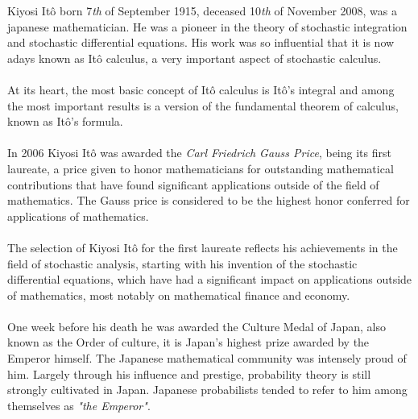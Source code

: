 \documentclass[11pt,a4paper, final]{article}
\begin{document}
\noindent Kiyosi Itô born 7\textit{th} of September 1915, deceased 10\textit{th} of November 2008, was a japanese mathematician. He was a pioneer in the theory of stochastic integration and stochastic differential equations. His work was so influential that it is now adays known as Itô calculus, a very important aspect of stochastic calculus. 
\\\\
At its heart, the most basic concept of Itô calculus is Itô's integral and among the most important results is a version of the fundamental theorem of calculus, known as Itô's formula.
\\\\
In 2006 Kiyosi Itô was awarded the \textit{Carl Friedrich Gauss Price}, being its first laureate, a price given to honor mathematicians for outstanding mathematical contributions that have found significant applications outside of the field of mathematics. The Gauss price is considered to be the highest honor conferred for applications of mathematics.
\\
\\
The selection of Kiyosi Itô for the first laureate reflects his achievements in the field of stochastic analysis, starting with his invention of the stochastic differential equations, which have had a significant impact on applications outside of mathematics, most notably on mathematical finance and economy. 
\\\\
One week before his death he was awarded the Culture Medal of Japan, also known as the Order of culture, it is Japan's highest prize awarded by the Emperor himself. The Japanese mathematical community was intensely proud of him. Largely through his influence and prestige, probability theory is still strongly cultivated in Japan. Japanese probabilists tended to refer to him among themselves as \textit{"the Emperor"}. 
\newpage 
\end{document}

